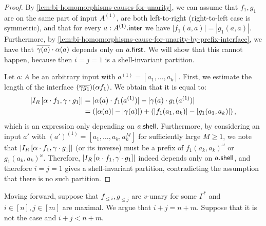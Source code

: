 \begin{proof}
    By \cref{lem:bi-homomorphisms-causes-for-unarity}, we can assume that $f_1,g_1$ are on the same part of input $A^{(1)}$, are both left-to-right (right-to-left case is symmetric), and that for every $a : A^{(1)} . \mathsf{inter}$ we have $|f_1(a,a)| = |g_1(a,a)|$. Furthermore, by \cref{lem:bi-homomorphisms-cause-for-unarity-by-prefix-interface}, we have that $\overline{\gamma(a)} \cdot \alpha(a)$ depends only on $a . \mathsf{first}$. We will show that this cannot happen, because then $i = j = 1$ is a shell-invariant partition.

    Let $a : A$ be an arbitrary input with $a^{(1)} = [a_1, \dots, a_k]$. First, we estimate the length of the interface $(\overline{\gamma g_1})(\alpha f_1)$. We obtain that it is equal to:
    \begin{align*}
        \left| I_R \left[ \alpha \cdot f_1, \gamma \cdot g_1 \right] \right| &= |\alpha(a) \cdot f_1(a^{(1)})| - |\gamma(a) \cdot g_1(a^{(1)})| \\
                       &= (|\alpha(a)| - |\gamma(a)|) + \left( |f_1(a_1, a_k)| - |g_1(a_1, a_k)| \right),
    \end{align*}
    which is an expression only depending on $a . \mathsf{shell}$. Furthermore, by considering an input $a'$ with $(a')^{(1)} = [a_1, \dots, a_k, a_k^M]$ for sufficiently large $M \geq 1$, we note that $\left| I_R \left[ \alpha \cdot f_1, \gamma \cdot g_1 \right] \right|$ (or its inverse) must be a prefix of $f_1(a_k, a_k)^\omega$ or $g_1(a_k, a_k)^\omega$. Therefore, $\left| I_R \left[ \alpha \cdot f_1, \gamma \cdot g_1 \right] \right|$ indeed depends only on $a . \mathsf{shell}$, and therefore $i = j = 1$ gives a shell-invariant partition, contradicting the assumption that there is no such partition.
\end{proof}

Moving forward, suppose that $f_{\leq i}, g_{\leq j}$ are $v$-unary for some $\Gamma^*$ and $i \in [n], j \in [m]$ are maximal. We argue that $i + j = n + m$. Suppose that it is not the case and $i + j < n + m$.

